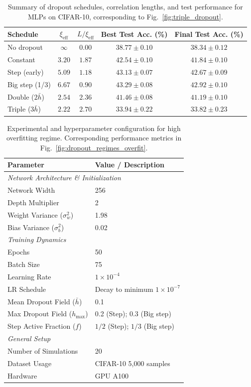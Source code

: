 \documentclass{article}
\theoremstyle{plain}
\theoremstyle{definition}
\theoremstyle{remark}
\begin{document}
\begin{table}[ht]
\caption{Summary of dropout schedules, correlation lengths, and test performance for MLPs on CIFAR-10, corresponding to Fig.~\ref{fig:triple_dropout}.}
\label{tab:triple_summary}
\centering
\begin{tabular}{lcccc}
\hline\hline
Schedule & $\xi_{\mathrm{eff}}$ & $L/\xi_{\mathrm{eff}}$ & Best Test Acc. (\%) & Final Test Acc. (\%) \\
\hline
No dropout & $\infty$ & $0.00$ & $38.77 \pm 0.10$ & $38.34 \pm 0.12$ \\
Constant & $3.20$ & $1.87$ & $42.54 \pm 0.10$ & $41.84 \pm 0.10$ \\
Step (early) & $5.09$ & $1.18$ & $43.13 \pm 0.07$ & $42.67 \pm 0.09$ \\
Big step (1/3) & $6.67$ & $0.90$ & $43.29 \pm 0.08$ & $42.92 \pm 0.10$ \\
Double ($2\bar{h}$) & $2.54$ & $2.36$ & $41.46 \pm 0.08$ & $41.19 \pm 0.10$ \\
Triple ($3\bar{h}$) & $2.22$ & $2.70$ & $33.94 \pm 0.22$ & $33.82 \pm 0.23$ \\
\hline\hline
\end{tabular}
\end{table}


\begin{table}[h]
 \caption{Experimental and hyperparameter configuration for high overfitting regime. Corresponding performance metrics in Fig.~\ref{fig:dropout_regimes_overfit}.}
 \label{tab:experiment_config_2}
 \centering
 \begin{tabular}{l l}
 \toprule
 \textbf{Parameter} & \textbf{Value / Description} \\
 \midrule
 \multicolumn{2}{l}{\textit{Network Architecture \& Initialization}} \\
 \midrule
 Network Width & 256 \\
 Depth Multiplier & 2 \\
 Weight Variance ($\sigma_w^2$) & 1.98 \\
 Bias Variance ($\sigma_b^2$) & 0.02 \\
 
 \midrule
 \multicolumn{2}{l}{\textit{Training Dynamics}} \\
 \midrule
 Epochs & 50 \\
 Batch Size & 75 \\
 Learning Rate & $1 \times 10^{-4}$ \\
 LR Schedule & Decay to minimum $1 \times 10^{-7}$ \\
 Mean Dropout Field ($\bar{h}$) & 0.1 \\
 Max Dropout Field ($h_{\max}$) & 0.2 (Step); 0.3 (Big step) \\
 Step Active Fraction ($f$) & $1/2$ (Step); $1/3$ (Big step) \\
 \midrule
 \multicolumn{2}{l}{\textit{General Setup}} \\
 \midrule
 Number of Simulations & 20 \\
 Dataset Usage & CIFAR-10 5,000 samples \\
 Hardware & GPU A100 \\
 \bottomrule
 \end{tabular}
\end{table}
\end{document}
